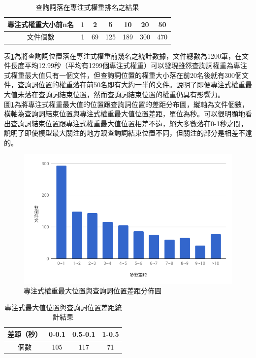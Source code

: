\begin{itemize}
\begin{table}[hb]
	 \centering
	 \caption{查詢詞落在專注式權重排名之結果}
	 \label{table:ch4_attpos}
	 \begin{tabular}{|c|c|c|c|c|c|c|}
		 \hline
		 專注式權重大小前n名&1 & 2 & 5 & 10 & 20 &50\\
		 \hline
		 文件個數&1 & 69 &125 &189 &300 &470\\
		 \hline
	   \end{tabular}
\end{table}
表\ref{table:ch4_attpos}為將查詢詞位置落在專注式權重前幾名之統計數據，文件總數為1200筆，在文件長度平均12.99秒（平均有1299個專注式權重）可以發現雖然查詢詞權重為專注式權重最大值只有一個文件，但查詢詞位置的權重大小落在前20名後就有300個文件，查詢詞位置的權重落在前50名即有大約一半的文件。說明了即便專注式權重最大值未落在查詢詞結束位置，然而查詢詞結束位置的權重仍具有影響力。
\\

圖\ref{fig:ch4_attdis}為將專注式權重最大值的位置跟查詢詞位置的差距分布圖，縱軸為文件個數，橫軸為查詢詞結束位置與專注式權重最大值位置差距，單位為秒。可以很明顯地看出查詢詞結束位置跟專注式權重最大值位置相差不遠，絕大多數落在0-1秒之間，說明了即使模型最大關注的地方跟查詢詞結束位置不同，但關注的部分是相差不遠的。
\begin{figure}
\centering
\includegraphics[scale=0.5]{images/ch4_attdis.png} 
\caption{專注式權重最大位置與查詢詞位置差距分佈圖}
\label{fig:ch4_attdis}
\end{figure}

\begin{table}[hb]
	 \centering
	 \caption{專注式最大值位置與查詢詞位置差距統計結果}
	 \label{table:ch4_attdis0-1}
	 \begin{tabular}{|c|c|c|c|}
		 \hline
		 差距（秒）& 0-0.1 & 0.5-0.1 & 1-0.5 \\
		 \hline
		 個數 & 105   & 117	  & 71 \\
		 \hline
	   \end{tabular}
\end{table}


\end{itemize}
